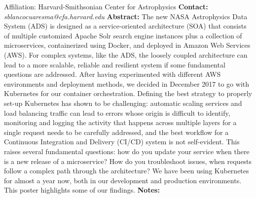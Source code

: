 \documentclass{report}
\begin{document}
{{{{{{{{{{{{{{{{{Affiliation: Harvard-Smithsonian Center for Astrophysics\newline\newline
{\bf Contact:} {\it sblancocuaresma@cfa.harvard.edu}\newline
\newline\newline
{\bf Abstract:}\newline
The new NASA Astrophysics Data System (ADS) is designed as a service-oriented architecture (SOA) that consists of multiple customized Apache Solr search engine instances plus a collection of microservices, containerized using Docker, and deployed in Amazon Web Services (AWS). For complex systems, like the ADS, the loosely coupled architecture can lead to a more scalable, reliable and resilient system if some fundamental questions are addressed. After having experimented with different AWS environments and deployment methods, we decided in December 2017 to go with Kubernetes for our container orchestration. Defining the best strategy to properly set-up Kubernetes has shown to be challenging: automatic scaling services and load balancing traffic can lead to errors whose origin is difficult to identify, monitoring and logging the activity that happens across multiple layers for a single request needs to be carefully addressed, and the best workflow for a Continuous Integration and Delivery (CI/CD) system is not self-evident. This raises several fundamental questions: how do you update your service when there is a new release of a microservice? How do you troubleshoot issues, when requests follow a complex path through the architecture? We have been using Kubernetes for almost a year now, both in our development and production environments. This poster highlights some of our findings.\newline
{\bf Notes:}\newline
{\newpage
}}}}}}}}}}}}}}}}}}
\end{document}
